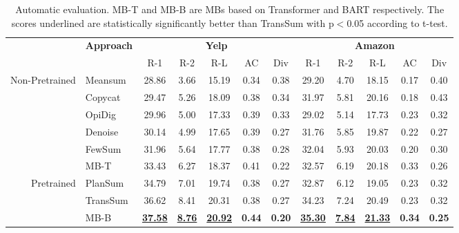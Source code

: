 \begin{table*}[ht]
	\centering
	\scriptsize
	\begin{tabular}{|r|l|ccccc|ccccc|}
		\hline
		&\multirow{2}{*}{\bf Approach} & \multicolumn{5}{c|}{\bf Yelp} &  \multicolumn{5}{c|}{\bf Amazon} \\ \cline{3-12}
		& & R-1 & R-2 & R-L& AC &Div & R-1 & R-2 & R-L& AC & Div\\
		\hline
		\multirow{6}{*}{Non-Pretrained}&Meansum & 28.86 & 3.66 & 15.19 & 0.34 & 0.38 &  29.20 &4.70 & 18.15& 0.17& 0.40\\
		&Copycat & 29.47 & 5.26 &18.09& 0.38 & 0.34 & 31.97 & 5.81 &20.16  & 0.18 & 0.43 \\
		&OpiDig & 29.96 &5.00 & 17.33& 0.39 & 0.33 & 29.02 & 5.14 & 17.73 & 0.23 & 0.32 \\
		&Denoise & 30.14 & 4.99 & 17.65& 0.39 & 0.27 &31.76 & 5.85 & 19.87 & 0.22 & 0.27 \\
		&FewSum\protect\footnotemark
		& 31.96 & 5.64 & 17.77 & 0.38 & 0.28 & 32.04 & 5.93 & 20.03 & 0.20 & 0.30 \\
		&MB-T & 33.43 & 6.27 & 18.37& 0.41 & 0.22 & 32.57 & 6.19 & 20.18 & 0.33 & 0.26\\
		\hline
		\multirow{3}{*}{Pretrained}&PlanSum & 34.79&7.01 &19.74 &0.38 & 0.27 & 32.87 &6.12 & 19.05 & 0.23 & 0.32\\
		&TransSum & 36.62&8.41 &20.31 &0.38 & 0.27 & 34.23& 7.24 & 20.49 & 0.23 & 0.32\\
		&MB-B & \underline{\bf 37.58} & \underline{\bf 8.76} & \underline{\bf 20.92} & \bf 0.44 & \bf 0.20 & \underline{\bf 35.30} & \underline{\bf 7.84} & \underline{\bf 21.33} & \bf 0.34 & \bf 0.25 \\
		\hline
	\end{tabular}
	\caption{Automatic evaluation. 
		MB-T and MB-B are MBs based on Transformer \cite{Transformer17} and BART \cite{BART20} respectively.
		The scores underlined are statistically
		significantly better than TransSum  with p$<$0.05 according to t-test.\protect\footnotemark
	}\label{tab:all}  
\end{table*}

